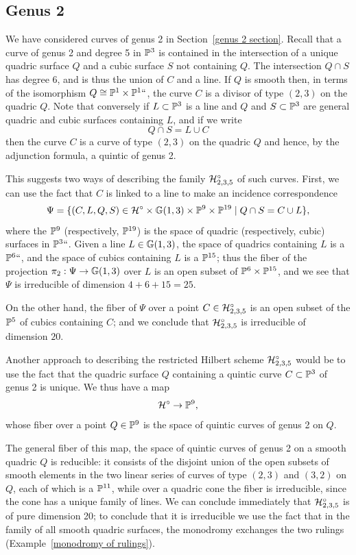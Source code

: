 \subsection*{Genus 2}

We have considered curves of genus 2 in Section~\ref{genus 2 section}.
Recall that a curve of genus 2 and degree 5 in
$\mathbb P^3$ is contained in the intersection of a unique quadric surface $Q$
and a cubic surface $S$ not containing $Q$.
The intersection $Q\cap S$
has degree 6, and is thus the union of $C$ and a line. If $Q$ is smooth
then, in terms of the isomorphism $Q \cong \mathbb P^1 \times \mathbb P^1` `$, the
curve $C$ is a divisor of type $(2,3)$ on the quadric $Q$. Note that
conversely if $L \subset \mathbb P^3$ is a line and $Q$ and $S \subset \mathbb P^3$
are general quadric and cubic surfaces containing $L$, and if we write
$$
Q \cap S = L \cup C
$$
then the curve $C$ is a curve of type $(2,3)$ on the quadric $Q$ and
hence, by the adjunction formula,
 a quintic of genus 2.

This suggests two ways of describing the family $\mathcal H^\circ_{2,3,5}$ of
such curves. First, we can use the fact that $C$ is linked to a line to
make an incidence correspondence
$$
\Psi = \{ (C, L, Q, S) \in \mathcal H^\circ \times {\mathbb G}(1,3) \times \mathbb P^9 \times
\mathbb P^{19} \relax \mid \relax Q \cap S = C \cup L \},
$$
where the $\mathbb P^9$ (respectively, $\mathbb P^{19}$) is the space of quadric
(respectively, cubic) surfaces in $\mathbb P^3` `$. Given a line $L \in {\mathbb G}(1,3)$,
the space of quadrics containing $L$ is a $\mathbb P^6` `$, and the space of cubics
containing $L$ is a $\mathbb P^{15}$; thus the fiber of the projection $\pi_2 :
\Psi \to {\mathbb G}(1,3)$ over $L$ is an open subset of $\mathbb P^6 \times \mathbb P^{15}$,
and we see that $\Psi$ is irreducible of dimension $4 + 6 + 15 = 25$.

On the other hand, the fiber of $\Psi$ over a point $C \in
\mathcal H^\circ_{2,3,5}$ is an open subset of the $\mathbb P^5$ of cubics containing
$C$; and we conclude that $\mathcal H^\circ_{2,3,5}$ is irreducible of dimension
$20$.

Another approach to describing the restricted Hilbert scheme
$\mathcal H^\circ_{2,3,5}$ would be to use the fact that the quadric surface $Q$
containing a quintic curve $C \subset \mathbb P^3$ of genus 2 is unique. We
thus have a map
$$
\mathcal H^\circ \to \mathbb P^9,
$$
whose fiber over a point $Q \in \mathbb P^9$ is the space of quintic curves
of genus 2 on $Q$.

The general fiber of this map, the space of quintic curves of genus 2 on a
smooth quadric $Q$ is  reducible: it consists of the disjoint union of the
open subsets of smooth elements in the two linear series of curves of type
$(2,3)$ and $(3,2)$ on $Q$, each of which is a $\mathbb P^{11}$, while over a
quadric cone the fiber is irreducible, since the cone has a unique
family of lines.  We can conclude immediately that $\mathcal H^\circ_{2,3,5}$
is of pure dimension 20; to conclude that it is irreducible we use the
fact that in the family of all smooth quadric surfaces, the
monodromy
%
exchanges the two rulings (Example~\ref{monodromy of rulings}).

